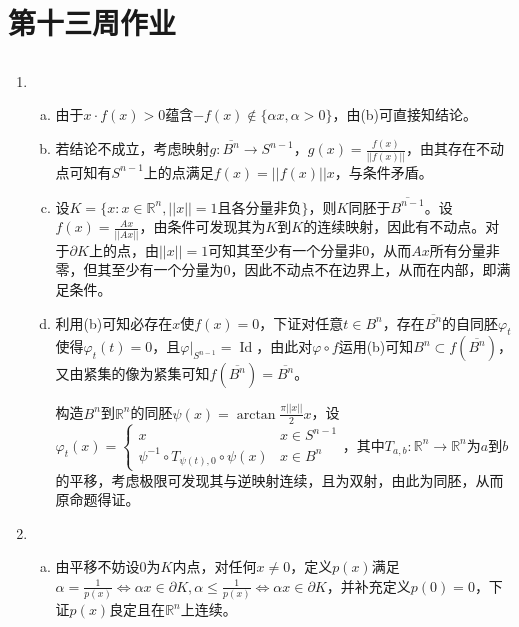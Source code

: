 \documentclass[a4paper,UTF8,fontset=windows]{ctexart}
\DeclareMathOperator{\Id}{Id}
\begin{document}
\section{第十三周作业}
\subsection{}
\begin{enumerate}[(1)]
    \item
    \begin{enumerate}[(a)]
    \item
    由于$x\cdot f(x)>0$蕴含$-f(x)\notin\{\alpha x,\alpha>0\}$，由(b)可直接知结论。
    
    \item
    若结论不成立，考虑映射$g:\overline{B^n}\to S^{n-1}$，$g(x)=\frac{f(x)}{||f(x)||}$，由其存在不动点可知有$S^{n-1}$上的点满足$f(x)=||f(x)||x$，与条件矛盾。
    
    \item
    设$K=\{x:x\in\mathbb{R}^n,||x||=1$且各分量非负$\}$，则$K$同胚于$\overline{B^{n-1}}$。设$f(x)=\frac{Ax}{||Ax||}$，由条件可发现其为$K$到$K$的连续映射，因此有不动点。对于$\partial K$上的点，由$||x||=1$可知其至少有一个分量非0，从而$Ax$所有分量非零，但其至少有一个分量为0，因此不动点不在边界上，从而在内部，即满足条件。
    
    \item
    利用(b)可知必存在$x$使$f(x)=0$，下证对任意$t\in B^n$，存在$\overline{B^n}$的自同胚$\varphi_t$使得$\varphi_t(t)=0$，且$\varphi|_{S^{n-1}}=\Id$，由此对$\varphi\circ f$运用(b)可知$B^n\subset f(\overline{B^n})$，又由紧集的像为紧集可知$f(\overline{B^n})=\overline{B^n}$。
    
    构造$B^n$到$\mathbb{R}^n$的同胚$\psi(x)=\arctan\frac{\pi||x||}{2}x$，设$\varphi_t(x)=\begin{cases}x&x\in S^{n-1}\\\psi^{-1}\circ T_{\psi(t),0}\circ\psi(x)&x\in B^n\end{cases}$，其中$T_{a,b}:\mathbb{R}^n\to\mathbb{R}^n$为$a$到$b$的平移，考虑极限可发现其与逆映射连续，且为双射，由此为同胚，从而原命题得证。
    \end{enumerate}
    
    \item
    \begin{enumerate}[(a)]
    \item
    由平移不妨设0为$K$内点，对任何$x\ne0$，定义$p(x)$满足$\alpha=\frac{1}{p(x)}\Leftrightarrow\alpha x\in\partial K,\alpha\le\frac{1}{p(x)}\Leftrightarrow\alpha x\in\partial K$，并补充定义$p(0)=0$，下证$p(x)$良定且在$\mathbb{R}^n$上连续。
    

\end{enumerate}
\end{enumerate}
\end{document}
